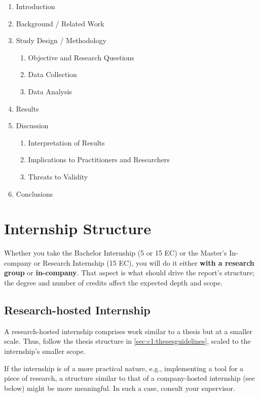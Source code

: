 \begin{enumerate}
    \item Introduction
    \item Background / Related Work
    \item Study Design / Methodology
    \begin{enumerate}
        \item Objective and Research Questions
        \item Data Collection
        \item Data Analysis
    \end{enumerate}
    \item Results
    \item Discussion
    \begin{enumerate}
        \item Interpretation of Results
        \item Implications to Practitioners and Researchers
        \item Threats to Validity
    \end{enumerate}
    \item Conclusions
\end{enumerate}

\section{Internship Structure}
\label{sec:c1:internshipguidelines}

Whether you take the Bachelor Internship (5 or 15 EC) or the Master's In-company or Research Internship (15 EC), you will do it either \textbf{with a research group} or \textbf{in-company}. That aspect is what should drive the report's structure; the degree and number of credits affect the expected depth and scope.

\subsection{Research-hosted Internship}
\label{sec:c1:researchinternship}

A research-hosted internship comprises work similar to a thesis but at a smaller scale. Thus, follow the thesis structure in \autoref{sec:c1:thesesguidelines}, scaled to the internship's smaller scope.

If the internship is of a more practical nature, e.g., implementing a tool for a piece of research, a structure similar to that of a company-hosted internship (see below) might be more meaningful. In such a case, consult your supervisor.


